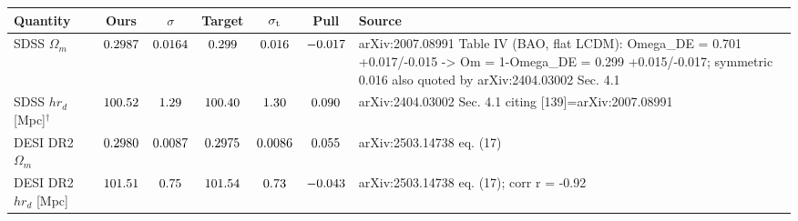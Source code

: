 \begin{tabular}{lcccccp{4.3cm}}
\toprule
Quantity & Ours & $\sigma$ & Target & $\sigma_{\rm t}$ & Pull & Source \\
\midrule
SDSS $\Omega_m$ & $0.2987$ & $0.0164$ & $0.299$ & $0.016$ & $-0.017$ & \scriptsize arXiv:2007.08991 Table IV (BAO, flat LCDM): Omega\_DE = 0.701 +0.017/-0.015 -> Om = 1-Omega\_DE = 0.299 +0.015/-0.017; symmetric 0.016 also quoted by arXiv:2404.03002 Sec. 4.1 \\
SDSS $h r_d$ [Mpc]$^\dagger$ & $100.52$ & $1.29$ & $100.40$ & $1.30$ & $0.090$ & \scriptsize arXiv:2404.03002 Sec. 4.1 citing [139]=arXiv:2007.08991 \\
DESI DR2 $\Omega_m$ & $0.2980$ & $0.0087$ & $0.2975$ & $0.0086$ & $0.055$ & \scriptsize arXiv:2503.14738 eq. (17) \\
DESI DR2 $h r_d$ [Mpc] & $101.51$ & $0.75$ & $101.54$ & $0.73$ & $-0.043$ & \scriptsize arXiv:2503.14738 eq. (17); corr r = -0.92 \\
\bottomrule
\end{tabular}
